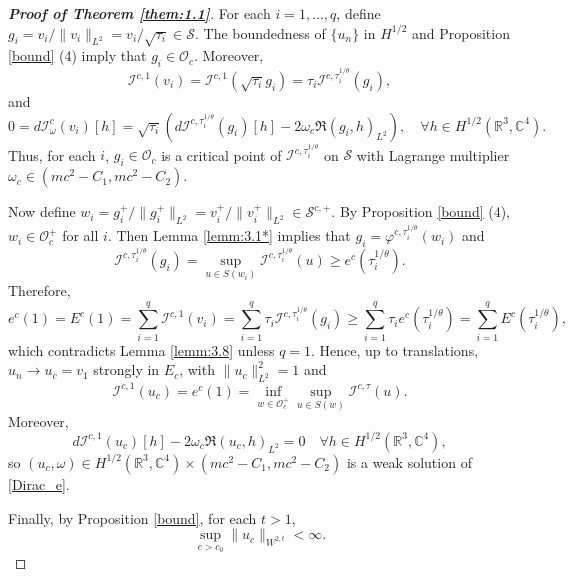 \documentclass{amsart}
\theoremstyle{plain}
\theoremstyle{definition}
\theoremstyle{remark}
\numberwithin{equation}{section} \numberwithin{figure}{section}
\begin{document}
\begin{proof}[\textbf{Proof of Theorem \ref{them:1.1}}]
  For each $i = 1, \dots, q$, define $g_i = v_i / \|v_i\|_{L^2} = v_i / \sqrt{\tau_i} \in \mathcal{S}$. The boundedness of $\{u_n\}$ in $H^{1/2}$ and Proposition \ref{bound} (4) imply that $g_i \in \mathcal{O}_c$. Moreover,  
  \[
  \mathcal{I}^{c,1}(v_i) = \mathcal{I}^{c,1}(\sqrt{\tau_i} g_i) = \tau_i \mathcal{I}^{c, \tau_i^{1/\theta}}(g_i),
  \]  
  and  
  \[
  0 = d\mathcal{I}_\omega^c(v_i)[h] = \sqrt{\tau_i} \left( d\mathcal{I}^{c, \tau_i^{1/\theta}}(g_i)[h] - 2\omega_c \Re(g_i, h)_{L^2} \right), \quad \forall h \in H^{1/2}(\mathbb{R}^3, \mathbb{C}^4).
  \]  
  Thus, for each $i$, $g_i \in \mathcal{O}_c$ is a critical point of $\mathcal{I}^{c, \tau_i^{1/\theta}}$ on $\mathcal{S}$ with Lagrange multiplier $\omega_c \in (mc^2 - C_1, mc^2 - C_2)$.  
  
  Now define $w_i = g_i^+ / \|g_i^+\|_{L^2} = v_i^+ / \|v_i^+\|_{L^2} \in \mathcal{S}^{c,+}$. By Proposition \ref{bound} (4), $w_i \in \mathcal{O}_c^+$ for all $i$. Then Lemma \ref{lemm:3.1*} implies that $g_i = \varphi^{c, \tau_i^{1/\theta}}(w_i)$ and  
  \[
  \mathcal{I}^{c, \tau_i^{1/\theta}}(g_i) = \sup_{u \in S(w_i)} \mathcal{I}^{c, \tau_i^{1/\theta}}(u) \geq e^c(\tau_i^{1/\theta}).
  \]  
  Therefore,  
  \[
  e^c(1) = E^c(1) = \sum_{i=1}^q \mathcal{I}^{c,1}(v_i) = \sum_{i=1}^q \tau_i \mathcal{I}^{c, \tau_i^{1/\theta}}(g_i) \geq \sum_{i=1}^q \tau_i e^c(\tau_i^{1/\theta}) = \sum_{i=1}^q E^c(\tau_i^{1/\theta}),
  \]  
  which contradicts Lemma \ref{lemm:3.8} unless $q = 1$. Hence, up to translations, $u_n \to u_c = v_1$ strongly in $E_c$, with $\|u_c\|_{L^2}^2 = 1$ and  
  \[
  \mathcal{I}^{c,1}(u_c) = e^c(1) = \inf_{w \in \mathcal{O}_c^+} \sup_{u \in S(w)} \mathcal{I}^{c,\tau}(u).
  \]  
  Moreover,  
  \[
  d\mathcal{I}^{c,1}(u_c)[h] - 2\omega_c \Re(u_c, h)_{L^2} = 0 \quad \forall h \in H^{1/2}(\mathbb{R}^3, \mathbb{C}^4),
  \]  
  so $(u_c, \omega) \in H^{1/2}(\mathbb{R}^3, \mathbb{C}^4) \times (mc^2 - C_1, mc^2 - C_2)$ is a weak solution of \eqref{Dirac_e}.  
  
  Finally, by Proposition \ref{bound}, for each $t > 1$,  
  \[
  \sup_{c > c_0} \|u_c\|_{W^{2,t}} < \infty.
  \]  
  \end{proof}
  
\end{document}
